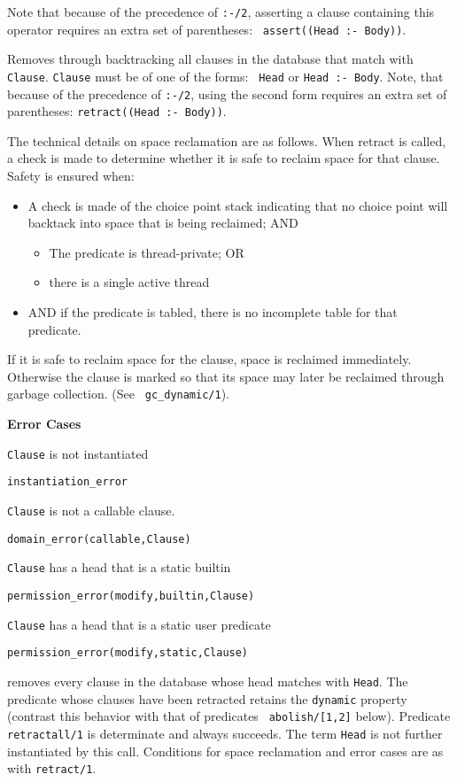 \begin{description}
Note that because of the precedence of {\tt :-/2}, asserting a clause
containing this operator requires an extra set of parentheses: {\tt
  assert((Head :- Body))}.

%
Removes through backtracking all clauses in the database that match
with {\tt Clause}.  {\tt Clause} must be of one of the forms: {\tt
  Head} or {\tt Head :- Body}.  Note, that because of the precedence
of {\tt :-/2}, using the second form requires an extra set of
parentheses: {\tt retract((Head :- Body))}.  

The technical details on space reclamation are as follows.  When
retract is called, a check is made to determine whether it is safe to
reclaim space for that clause.  Safety is ensured when:
\begin{itemize}
\item A check is made of the choice point stack indicating that no
  choice point will backtack into space that is being reclaimed; AND
\begin{itemize}
\item The predicate is thread-private; OR 
\item there is a single active thread
\end{itemize}
\item AND if the predicate is tabled, there is no incomplete table
     for that predicate.
\end{itemize}
If it is safe to reclaim space for the clause, space is reclaimed
immediately.  Otherwise the clause is marked so that its space may
later be reclaimed through garbage collection.  (See {\tt
  gc\_dynamic/1}).

{\bf Error Cases}
\bi
\item 	{\tt Clause} is not instantiated
\bi
\item 	{\tt instantiation\_error}
\ei
%
\item 	{\tt Clause} is not a callable clause.
\bi
\item 	{\tt domain\_error(callable,Clause)}
\ei
%
\item 	{\tt Clause} has a head that is a static builtin
\bi
\item 	{\tt permission\_error(modify,builtin,Clause)}
\ei
\item 	{\tt Clause} has a head that is a static user predicate
\bi
\item 	{\tt permission\_error(modify,static,Clause)}
\ei
%
\ei

 removes every
clause in the database whose head matches with {\tt Head}.  The
predicate whose clauses have been retracted retains the {\tt dynamic}
property (contrast this behavior with that of predicates {\tt
  abolish/[1,2]} below).  Predicate {\tt retractall/1} is determinate
and always succeeds.  The term {\tt Head} is not further instantiated
by this call.  Conditions for space reclamation and error cases are as
with {\tt retract/1}.


\end{description}
